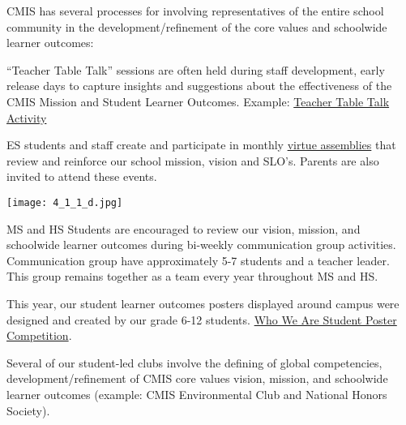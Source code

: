 

\begin{findings}
CMIS has several processes for involving representatives of the entire school community in the development/refinement of the core values and schoolwide learner outcomes:

“Teacher Table Talk” sessions are often held during staff development, early release days to capture insights and suggestions about the effectiveness of the CMIS Mission and Student Learner Outcomes.  Example: \href{https://drive.google.com/a/cmis.ac.th/file/d/0ByVFfrm0zfolbHNvSWhVWmJYU3M/view?usp=sharing}{Teacher Table Talk Activity} 

ES students and staff create and participate in monthly \href{https://docs.google.com/a/cmis.ac.th/document/d/1Mv1xjTpbY36naur8SDt9GanKNfR7YtYVL-bWwGLPSHo/edit?usp=sharing}{virtue assemblies} that review and reinforce our school mission, vision and SLO’s. Parents are also invited to attend these events.

{\centering\texttt{[image: 4\_1\_1\_d.jpg]}}

MS and HS Students are encouraged to review our vision, mission, and schoolwide learner outcomes during bi-weekly communication group activities. Communication group have approximately 5-7 students and a teacher leader. This group remains together as a team every year throughout MS and HS.
 
This year, our student learner outcomes posters displayed around campus were designed and created by our grade 6-12 students. \href{https://docs.google.com/a/cmis.ac.th/document/d/1x29XpA7Ro2Xav3JFY0k9F2O22qZi4Yo48hVTYkvhoGM/edit?usp=sharing}{Who We Are Student Poster Competition}.

Several of our student-led clubs involve the defining of global competencies, development/refinement of CMIS core values vision, mission, and schoolwide learner outcomes  (example: CMIS Environmental Club and National Honors Society).


\end{findings}
